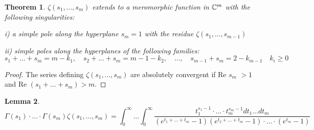 \documentclass[10pt]{article}
\newtheorem{theorem}{Theorem}[section]
\newtheorem{lemma}[theorem]{Lemma}
\begin{document}
\begin{theorem} \label{ancont}
$\zeta(s_1,...,s_m)$ extends to a meromorphic function in   ${\mathbb C}^m$ with the following singularities:

i) a simple pole along the hyperplane $s_m =1$ with the residue $\zeta(s_1,...,s_{m-1})$  

ii) simple poles along the hyperplanes of the following families: 
$$
s_1 + ... +s_m= m-k_1, \quad s_2 + ... +s_m = m-1-k_2, \quad ..., \quad s_{m-1} +   s_m= 2-k_{m-1}
\quad  k_i \geq 0
$$
\end{theorem}

\begin{proof} The series defining $\zeta(s_1,...,s_m)$  are absolutely convergent
 if Re $s_m$ $>1$ and Re $(s_1 + ... + s_m) >m$.%
  

\end{proof}

\begin{lemma} \label{l1mzf1}
\begin{equation} \label{mzf1 }
\Gamma(s_1)\cdot ... \cdot \Gamma(s_m)\zeta(s_1,...,s_m) = \int_0^{\infty}...\int_0^{\infty} \frac{t_1^{s_1-1}\cdot ... \cdot t_m^{s_m-1} dt_1...dt_m}{(e^{t_1+...+t_m}-1)  (e^{t_2+...+t_m}-1)\cdot ... \cdot(e^{t_m}-1)}
\end{equation}
\end{lemma}
\end{document}
